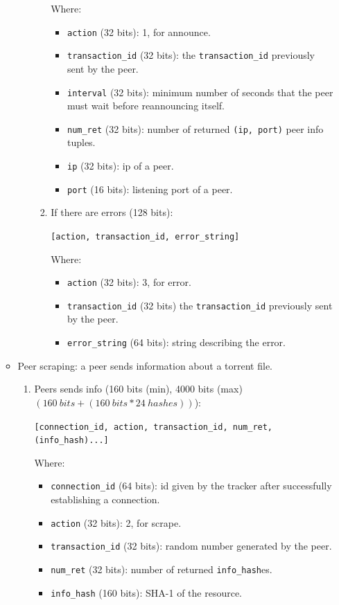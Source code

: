 \documentclass[twoside,a4paper,10pt]{article}
\begin{document}
\begin{itemize}
\begin{itemize}
\begin{enumerate}
\begin{enumerate}
        Where:
        \begin{itemize}
        \item \texttt{action} (32 bits): 1, for announce.
        \item \texttt{transaction\_id} (32 bits): the \texttt{transaction\_id}
          previously sent by the peer.
        \item \texttt{interval} (32 bits): minimum number of seconds that the
          peer must wait before reannouncing itself.
        \item \texttt{num\_ret} (32 bits): number of returned \texttt{(ip, port)}
          peer info tuples.
        \item \texttt{ip} (32 bits): ip of a peer.
        \item \texttt{port} (16 bits): listening port of a peer.
        \end{itemize}  
      \item If there are errors (128 bits):

        \texttt{[action, transaction\_id, error\_string]}

        Where:
        \begin{itemize}
        \item \texttt{action} (32 bits): 3, for error.
        \item \texttt{transaction\_id} (32 bits)
          the \texttt{transaction\_id} previously sent by the peer.
        \item \texttt{error\_string} (64 bits): string describing the error.
        \end{itemize}
      \end{enumerate}
    \end{enumerate}
  \item Peer scraping: a peer sends information about a torrent file.
    \begin{enumerate}
    \item Peers sends info (160 bits (min), 4000 bits (max)
      $(160\ bits + (160\ bits * 24\ hashes))$):

      \texttt{[connection\_id, action, transaction\_id, num\_ret,
          (info\_hash)...]}

      Where:
      \begin{itemize}
      \item \texttt{connection\_id} (64 bits): id given by the tracker after
        successfully establishing a connection.
      \item \texttt{action} (32 bits): 2, for scrape.
      \item \texttt{transaction\_id} (32 bits): random number generated by
        the peer.
      \item \texttt{num\_ret} (32 bits): number of returned
        \texttt{info\_hash}es.
      \item \texttt{info\_hash} (160 bits): SHA-1 of the resource.
      \end{itemize}
      

\end{enumerate}
\end{itemize}
\end{itemize}
\end{document}
